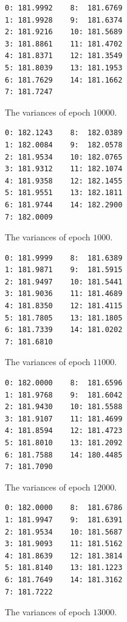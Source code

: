 \documentclass[a4paper, 10pt, notitlepage, twocolumn]{article}
\begin{document}
\FloatBarrier

\begin{figure}[!ht]
 \begin{verbatim}
0: 181.9992    8:  181.6769
1: 181.9928    9:  181.6374
2: 181.9216    10: 181.5689
3: 181.8861    11: 181.4702
4: 181.8371    12: 181.3549
5: 181.8039    13: 181.1953
6: 181.7629    14: 181.1662
7: 181.7247
 \end{verbatim}
 \vspace{-20pt} 
 \caption{The variances of epoch $10000$.}
\end{figure}

\begin{figure}[!ht]
 \begin{verbatim}
0: 182.1243    8:  182.0389
1: 182.0084    9:  182.0578
2: 181.9534    10: 182.0765
3: 181.9312    11: 182.1074
4: 181.9358    12: 182.1455
5: 181.9551    13: 182.1811
6: 181.9744    14: 182.2900
7: 182.0009
 \end{verbatim}
 \vspace{-20pt} 
 \caption{The variances of epoch $1000$.}
\end{figure}

\begin{figure}[!ht]
 \begin{verbatim}
0: 181.9999    8:  181.6389
1: 181.9871    9:  181.5915
2: 181.9497    10: 181.5441
3: 181.9036    11: 181.4689
4: 181.8350    12: 181.4115
5: 181.7805    13: 181.1805
6: 181.7339    14: 181.0202
7: 181.6810
 \end{verbatim}
 \vspace{-20pt} 
 \caption{The variances of epoch $11000$.}
\end{figure}

\begin{figure}[!ht]
 \begin{verbatim}
0: 182.0000    8:  181.6596
1: 181.9768    9:  181.6042
2: 181.9430    10: 181.5588
3: 181.9107    11: 181.4699
4: 181.8594    12: 181.4723
5: 181.8010    13: 181.2092
6: 181.7588    14: 180.4485
7: 181.7090
 \end{verbatim}
 \vspace{-20pt} 
 \caption{The variances of epoch $12000$.}
\end{figure}

\begin{figure}[!ht]
 \begin{verbatim}
0: 182.0000    8:  181.6786
1: 181.9947    9:  181.6391
2: 181.9534    10: 181.5687
3: 181.9093    11: 181.5162
4: 181.8639    12: 181.3814
5: 181.8140    13: 181.1223
6: 181.7649    14: 181.3162
7: 181.7222
 \end{verbatim}
 \vspace{-20pt} 
 \caption{The variances of epoch $13000$.}
\end{figure}
\end{document}
